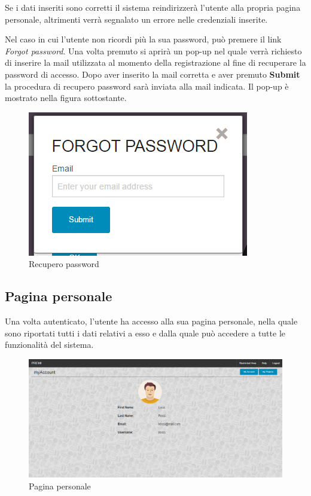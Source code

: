 \noindent Se i dati inseriti sono corretti il sistema reindirizzerà l'utente alla propria pagina personale, altrimenti verrà segnalato un errore nelle credenziali inserite.



\noindent Nel caso in cui l'utente non ricordi più la sua password, può premere il link \textit{Forgot password}. Una volta premuto si aprirà un pop-up nel quale verrà richiesto di inserire la mail utilizzata al momento della registrazione al fine di recuperare la password di accesso. Dopo aver inserito la mail corretta e aver premuto \textbf{Submit} la procedura di recupero password sarà inviata alla mail indicata. Il pop-up è mostrato nella figura sottostante.

\begin{figure}[H] 
	\centering 
	\includegraphics[scale=0.40] {img/forgot.png}
	\caption{Recupero password} 
\end{figure}

\subsection{Pagina personale}
Una volta autenticato, l'utente ha accesso alla sua pagina personale, nella quale sono riportati tutti i dati relativi a esso e dalla quale può accedere a tutte le funzionalità del sistema.

\begin{figure}[H] 
	\centering 
	\includegraphics[scale=0.40] {img/MyAccount.png}
	\caption{Pagina personale} 
\end{figure}

